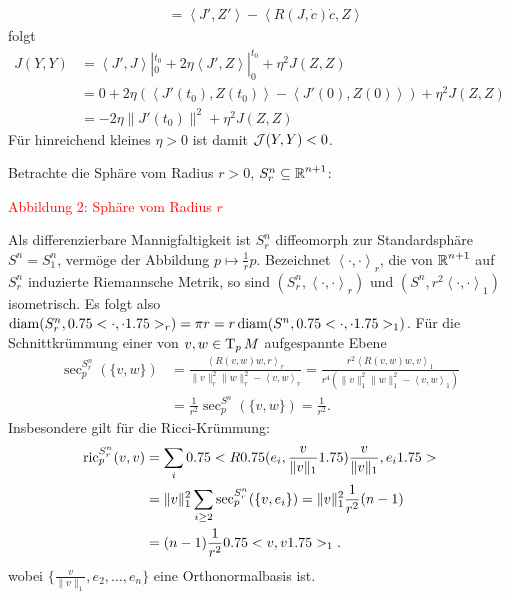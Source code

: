\begin{bew}
\begin{enumerate}[label=(\roman*),leftmargin=*,widest=ii]
\begin{description}
\begin{align*}
      	&= \left<J',Z'\right> - \left<R(J,\dot c) \dot c,Z\right>
    \end{align*}
    folgt
    \begin{align*}
      J(Y,Y) & = \left<J',J\right>|_0^{t_0} + 2 \eta \left<J',Z\right>|_0^{t_0} + \eta^2J(Z,Z)\\
      & = 0 + 2 \eta\left(\left<J'(t_0),Z(t_0) \right> - \left<J'(0),Z(0)\right>\right) + \eta^2 J(Z,Z)\\
      & = -2\eta \|J'(t_0)\|^2 + \eta^2J(Z,Z)
    \end{align*}
    Für hinreichend kleines $\eta > 0$ ist damit $\operatorname{\mathcal{J}}(Y,Y) < 0$.
    \end{description}
  \end{enumerate}\end{bew}

Betrachte die Sphäre vom Radius $r > 0$, $S^n_r \subseteq \operatorname{\mathbb{R}}^{n+1}$:

\begin{center}
  \textcolor{red}{Abbildung 2: Sphäre vom Radius $r$}
\end{center}

Als differenzierbare Mannigfaltigkeit ist $S^n_r$ diffeomorph zur Standardsphäre $S^n = S^n_1$, vermöge der Abbildung $p \mapsto \frac{1}{r}p$. Bezeichnet $\left<\cdot,\cdot\right>_r$, die von
$\operatorname{\mathbb{R}}^{n+1}$ auf $S^n_r$ induzierte Riemannsche Metrik, so sind $(S^n_r,\left<\cdot,\cdot\right>_r)$ und $(S^n,r^2\left<\cdot,\cdot\right>_1)$ isometrisch.
Es folgt also $\operatorname{diam}(S^n_r,0.75<\cdot,\cdot1.75>_r) = \pi r = r \operatorname{diam}(S^n,0.75<\cdot,\cdot1.75>_1)$.
Für die Schnittkrümmung einer von $v,w \in \operatorname{T}_pM$ aufgespannte Ebene
\begin{align*}
  \sec_p^{S^n_r}(\{v,w\}) & =
  \frac{\left<R(v,w)w,r\right>_r}{\|v\|_r^2\|w\|_r^2-\left<v,w\right>_r}
  =
  \frac{r^2\left<R(v,w)w,v\right>_1}{r^4(\|v\|_1^2\|w\|_1^2-\left<v,w\right>_1)}\\
  & = \frac{1}{r^2} \sec_p^{S^n}(\{v,w\}) = \frac{1}{r^2}.
\end{align*}
Insbesondere gilt für die Ricci-Krümmung:
\begin{align*}
  \operatorname{ric}_p^{S_r^n}(v,v) & = \sum_i 0.75<R0.75(e_i,\frac{v}{\|v\|_1}1.75)\frac{v}{\|v\|_1},e_i1.75>\\
  & = \|v\|_1^2\sum_{i \geq 2}\sec_p^{S^n_r}(\{v,e_i\}) = \|v\|_1^2 \frac{1}{r^2}(n-1)\\
  & = (n-1)\frac{1}{r^2}0.75<v,v1.75>_1.
\end{align*}
wobei $\{\frac{v}{\|v\|_1}, e_2, \ldots, e_n\}$ eine Orthonormalbasis ist.

